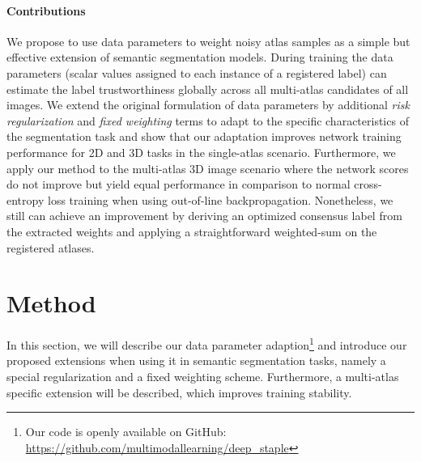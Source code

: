 \paragraph{\textbf{Contributions}}
\label{sec:contributions}
We propose to use data parameters \cite{saxena2019data} to weight noisy atlas samples as a simple but effective extension of semantic segmentation models. During training the data parameters (scalar values assigned to each instance of a registered label) can estimate the label trustworthiness globally across all multi-atlas candidates of all images.
We extend the original formulation of data parameters by additional \emph{risk regularization} and \emph{fixed weighting} terms to adapt to the specific characteristics of the segmentation task and show that our adaptation improves network training performance for 2D and 3D tasks in the single-atlas scenario.
Furthermore, we apply our method to the multi-atlas 3D image scenario where the network scores do not improve but yield equal performance in comparison to normal cross-entropy loss training when using {out-of-line backpropagation}.
Nonetheless, we still can achieve an improvement by deriving an optimized consensus label from the extracted weights and applying a straightforward weighted-sum on the registered atlases.

\section{Method}
\label{sec:method_deepstaple}
    In this section, we will describe our data parameter adaption\footnote{Our code is openly available on GitHub: \url{https://github.com/multimodallearning/deep_staple}} and introduce our proposed extensions when using it in semantic segmentation tasks, namely a special regularization and a fixed weighting scheme. Furthermore, a multi-atlas specific extension will be described, which improves training stability.
